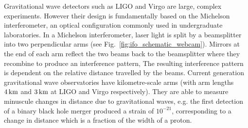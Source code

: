\documentclass[paper-main.tex]{subfiles}
\begin{document}
Gravitational wave detectors such as LIGO and Virgo are large, complex experiments. 
However their design is fundamentally based on the Michelson interferometer, an optical configuration commonly used in undergraduate laboratories. 
In a Michelson interferometer, laser light is split by a beamsplitter into two perpendicular arms (see Fig.~\ref{fig:ifo_schematic_webcam}). 
Mirrors at the end of each arm reflect the two beams back to the beamsplitter where they recombine to produce an interference pattern, 
The resulting interference pattern is dependent on the relative distance travelled by the beams. 
Current generation gravitational wave observatories have kilometre-scale arms (with arm lengths $4\,{\rm km}$ and $3\,{\rm km}$ at LIGO and Virgo respectively). 
They are able to measure minuscule changes in distance due to gravitational waves, e.g. the first detection of a binary black hole merger produced a strain of $10^{-21}$, corresponding to a change in distance which is a fraction of the width of a proton. 

\end{document}
